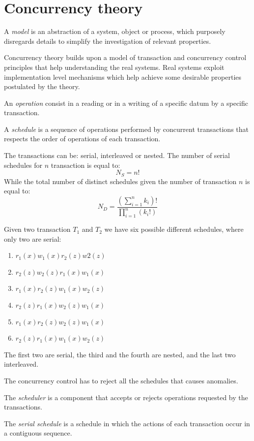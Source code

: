 \documentclass[12pt, a4paper]{report}
\begin{document}
    \section{Concurrency theory}
    \begin{definition}
        A \emph{model} is an abstraction of a system, object or process, which purposely disregards details to simplify the investigation of relevant properties. 
    \end{definition}
    Concurrency theory builds upon a model of transaction and concurrency control principles that help understanding the real systems. Real systems exploit implementation level 
    mechanisms which help achieve some desirable properties postulated by the theory. 
    \begin{definition}
        An \emph{operation} consist in a reading or in a writing of a specific datum by a specific transaction. 

        A \emph{schedule} is a sequence of operations performed by concurrent transactions that respects the order of operations of each transaction. 
    \end{definition}
    The transactions can be: serial, interleaved or nested. The number of serial schedules for $n$ transaction is equal to: 
    \[N_S=n!\]
    While the total number of distinct schedules given the number of transaction $n$ is equal to: 
    \[N_D=\dfrac{\left( \sum_{i=1}^nk_i \right)!}{\prod_{i=1}^n \left( k_i! \right)}\]
    \begin{example}
        Given two transaction $T_1$ and $T_2$ we have six possible different schedules, where only two are serial:
        \begin{enumerate}
            \item $r_1(x) w_1(x) r_2(z) w2(z)$
            \item $r_2(z) w_2(z) r_1(x) w_1(x)$
            \item $r_1(x) r_2(z) w_1(x) w_2(z)$
            \item $r_2(z) r_1(x) w_2(z) w_1(x)$
            \item $r_1(x) r_2(z) w_2(z) w_1(x)$
            \item $r_2(z) r_1(x) w_1(x) w_2(z)$
        \end{enumerate}
        The first two are serial, the third and the fourth are nested, and the last two interleaved.
    \end{example}
    The concurrency control has to reject all the schedules that causes anomalies. 
    \begin{definition}
        The \emph{scheduler} is a component that accepts or rejects operations requested by the transactions. 

        The \emph{serial schedule} is a schedule in which the actions of each transaction occur in a contiguous sequence.
    \end{definition}
\end{document}
